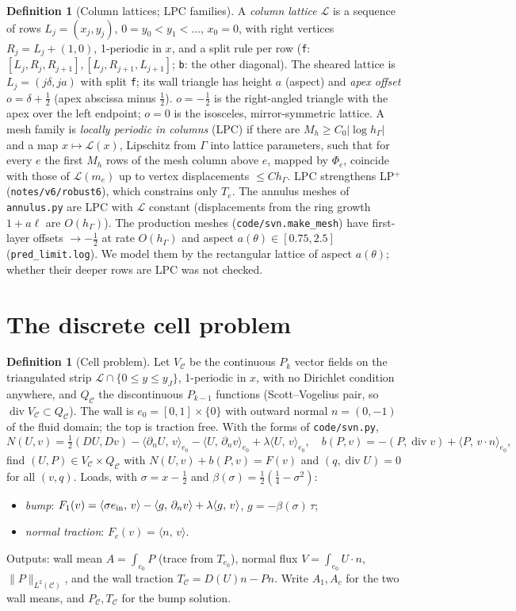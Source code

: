 \documentclass[11pt,reqno]{amsart}
\theoremstyle{plain}
\theoremstyle{definition}
\newtheorem{definition}[theorem]{Definition}
\newcommand{\hG}{h_\Gamma}
\newcommand{\ip}[2]{\langle #1,\, #2\rangle}
\newcommand{\norm}[1]{\lVert #1\rVert}
\renewcommand{\div}{\operatorname{div}}
\newcommand{\Lc}{\mathcal L}
\newcommand{\Cc}{\mathcal C}
\begin{document}
\begin{definition}[Column lattices; LPC families]\label{def:lpc}
A \emph{column lattice} $\Lc$ is a sequence of rows $L_j=(x_j,y_j)$, $0=y_0<y_1<\dots$, $x_0=0$, with right vertices $R_j=L_j+(1,0)$, 1-periodic in $x$, and a split rule per row (\texttt f: $[L_j,R_j,R_{j+1}],[L_j,R_{j+1},L_{j+1}]$; \texttt b: the other diagonal). The sheared lattice is $L_j=(j\delta,ja)$ with split \texttt f; its wall triangle has height $a$ (aspect) and \emph{apex offset} $o=\delta+\frac12$ (apex abscissa minus $\frac12$). $o=-\frac12$ is the right-angled triangle with the apex over the left endpoint; $o=0$ is the isosceles, mirror-symmetric lattice. A mesh family is \emph{locally periodic in columns} (LPC) if there are $M_h\ge C_0|\log\hG|$ and a map $x\mapsto\Lc(x)$, Lipschitz from $\Gamma$ into lattice parameters, such that for every $e$ the first $M_h$ rows of the mesh column above $e$, mapped by $\Phi_e$, coincide with those of $\Lc(m_e)$ up to vertex displacements $\le C\hG$. LPC strengthens LP$^+$ (\texttt{notes/v6/robust6}), which constrains only $T_e$. The annulus meshes of \texttt{annulus.py} are LPC with $\Lc$ constant (displacements from the ring growth $1+a\ell$ are $O(\hG)$). The production meshes (\texttt{code/svn.make\_mesh}) have first-layer offsets $\to-\frac12$ at rate $O(\hG)$ and aspect $a(\theta)\in[0.75,2.5]$ (\texttt{pred\_limit.log}). We model them by the rectangular lattice of aspect $a(\theta)$; whether their deeper rows are LPC was not checked.
\end{definition}

\section{The discrete cell problem}

\begin{definition}[Cell problem]\label{def:cell}
Let $V_\Cc$ be the continuous $P_k$ vector fields on the triangulated strip $\Lc\cap\{0\le y\le y_J\}$, 1-periodic in $x$, with no Dirichlet condition anywhere, and $Q_\Cc$ the discontinuous $P_{k-1}$ functions (Scott--Vogelius pair, so $\div V_\Cc\subset Q_\Cc$). The wall is $e_0=[0,1]\times\{0\}$ with outward normal $n=(0,-1)$ of the fluid domain; the top is traction free. With the forms of \texttt{code/svn.py},
\[
N(U,v)=\tfrac12(DU,Dv)-\ip{\partial_nU}{v}_{e_0}-\ip U{\partial_nv}_{e_0}+\lambda\ip Uv_{e_0},\quad b(P,v)=-(P,\div v)+\ip P{v\cdot n}_{e_0},
\]
find $(U,P)\in V_\Cc\times Q_\Cc$ with $N(U,v)+b(P,v)=F(v)$ and $(q,\div U)=0$ for all $(v,q)$. Loads, with $\sigma=x-\frac12$ and $\beta(\sigma)=\frac12(\frac14-\sigma^2)$:
\begin{itemize}
\item \emph{bump}: $F_1(v)=\ip{\sigma e_{\rm in}}v-\ip g{\partial_nv}+\lambda\ip gv$, $g=-\beta(\sigma)\,\tau$;
\item \emph{normal traction}: $F_c(v)=\ip nv$.
\end{itemize}
Outputs: wall mean $A=\int_{e_0}P$ (trace from $T_{e_0}$), normal flux $V=\int_{e_0}U\cdot n$, $\norm{P}_{L^2(\Cc)}$, and the wall traction $T_\Cc=D(U)n-Pn$. Write $A_1,A_c$ for the two wall means, and $P_\Cc,T_\Cc$ for the bump solution.
\end{definition}
\end{document}
